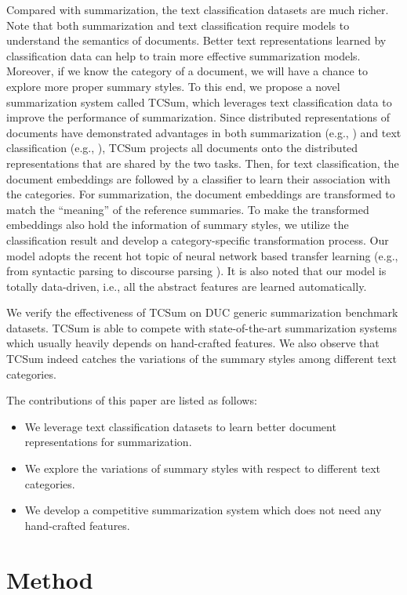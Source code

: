 \documentclass[letterpaper]{article}
\begin{document}
Compared with summarization, the text classification datasets are much richer.
Note that both summarization and text classification require models to understand the semantics of documents.
Better text representations learned by classification data can help to train more effective summarization models.
Moreover, if we know the category of a document, we will have a chance to explore more proper summary styles.
To this end, we propose a novel summarization system called TCSum, which leverages text classification data to improve the performance of summarization.
Since distributed representations of documents have demonstrated advantages in both summarization (e.g., \cite{kobayashi-noguchi-yatsuka:2015:EMNLP}) and text classification (e.g., \cite{lai2015recurrent}), TCSum projects all documents onto the distributed representations that are shared by the two tasks.
Then, for text classification, the document embeddings are followed by a classifier to learn their association with the categories.
For summarization, the document embeddings are transformed to match the ``meaning'' of the reference summaries.
To make the transformed embeddings also hold the information of summary styles, we utilize the classification result and develop a category-specific transformation process.
Our model adopts the recent hot topic of neural network based transfer learning (e.g., from syntactic parsing to discourse parsing \cite{li2014recursive}).
It is also noted that our model is totally data-driven, i.e., all the abstract features are learned automatically.


We verify the effectiveness of TCSum on DUC generic summarization benchmark datasets.
TCSum is able to compete with state-of-the-art summarization systems which usually heavily depends on hand-crafted features.
We also observe that TCSum indeed catches the variations of the summary styles among different text categories.

The contributions of this paper are listed as follows:
\begin{itemize}
	\item We leverage text classification datasets to learn better document representations for summarization.
	\item We explore the variations of summary styles with respect to different text categories.
	\item We develop a competitive summarization system which does not need any hand-crafted features.
\end{itemize}

\section{Method}
\end{document}

